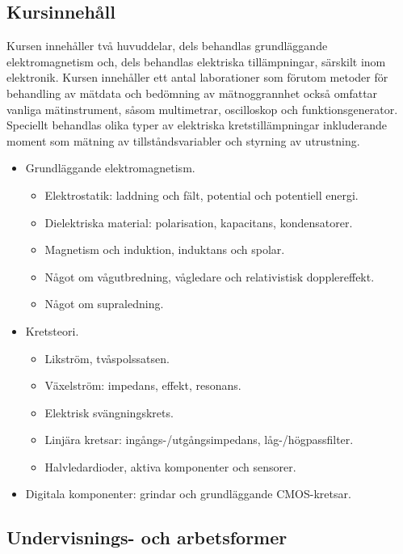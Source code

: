 \subsection*{Kursinnehåll}

Kursen innehåller två huvuddelar, dels behandlas grundläggande
elektromagnetism och, dels behandlas elektriska tillämpningar, särskilt
inom elektronik. Kursen innehåller ett antal laborationer som förutom
metoder för behandling av mätdata och bedömning av mätnoggrannhet också
omfattar vanliga mätinstrument, såsom multimetrar, oscilloskop och
funktionsgenerator. Speciellt behandlas olika typer av elektriska
kretstillämpningar inkluderande moment som mätning av
tillståndsvariabler och styrning av utrustning.

\begin{itemize}
\tightlist
\item
  Grundläggande elektromagnetism.

  \begin{itemize}
  \tightlist
  \item
    Elektrostatik: laddning och fält, potential och potentiell energi.
  \item
    Dielektriska material: polarisation, kapacitans, kondensatorer.
  \item
    Magnetism och induktion, induktans och spolar.
  \item
    Något om vågutbredning, vågledare och relativistisk dopplereffekt.
  \item
    Något om supraledning.
  \end{itemize}
\item
  Kretsteori.

  \begin{itemize}
  \tightlist
  \item
    Likström, tvåspolssatsen.
  \item
    Växelström: impedans, effekt, resonans.
  \item
    Elektrisk svängningskrets.
  \item
    Linjära kretsar: ingångs-/utgångsimpedans, låg-/högpassfilter.
  \item
    Halvledardioder, aktiva komponenter och sensorer.
  \end{itemize}
\item
  Digitala komponenter: grindar och grundläggande CMOS-kretsar.
\end{itemize}

\subsection*{Undervisnings- och
arbetsformer}

